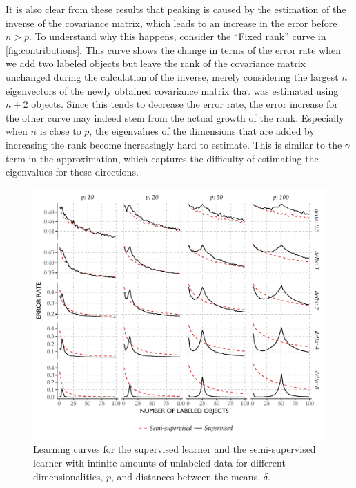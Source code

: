 \documentclass[twoside]{memoir}\usepackage[]{graphicx}\usepackage{xcolor}
\makeatletter
\def\maxwidth{ %
  \ifdim\Gin@nat@width>\linewidth
    \linewidth
  \else
    \Gin@nat@width
  \fi
}
\newenvironment{knitrout}{}{} %
\makeatother
\begin{document}
It is also clear from these results that peaking is caused by the estimation of the inverse of the covariance matrix, which leads to an increase in the error before $n>p$. To understand why this happens, consider the ``Fixed rank'' curve in \cref{fig:contributions}. This curve shows the change in terms of the error rate when we add two labeled objects but leave the rank of the covariance matrix unchanged during the calculation of the inverse, merely considering the largest $n$ eigenvectors of the newly obtained covariance matrix that was estimated using $n+2$ objects. Since this tends to decrease the error rate, the error increase for the other curve may indeed stem from the actual growth of the rank. Especially when $n$ is close to $p$, the eigenvalues of the dimensions that are added by increasing the rank become increasingly hard to estimate. This is similar to the $\gamma$ term in the approximation, which captures the difficulty of estimating the eigenvalues for these directions.

\begin{knitrout}
\color{fgcolor}\begin{figure}
\includegraphics[width=\maxwidth]{figure/infinitedata-1} \caption[Learning curves for the supervised learner and the semi-supervised learner with infinite amounts of unlabeled data for different dimensionalities, $p$, and distances between the means, $\delta$]{Learning curves for the supervised learner and the semi-supervised learner with infinite amounts of unlabeled data for different dimensionalities, $p$, and distances between the means, $\delta$.}\label{fig:infinitedata}
\end{figure}


\end{knitrout}
\end{document}
